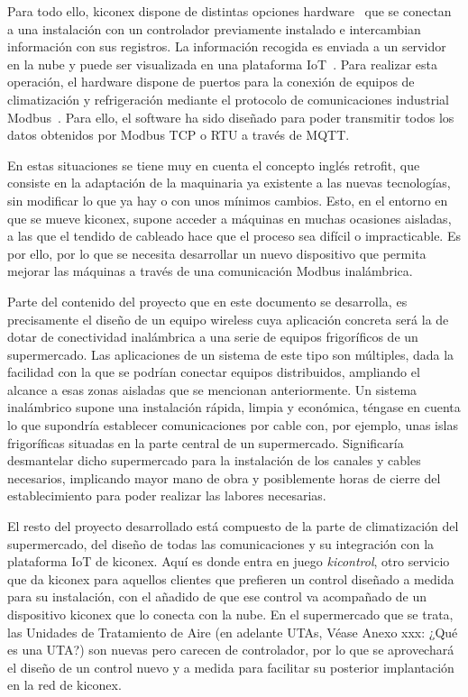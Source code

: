 Para todo ello, kiconex dispone de distintas opciones hardware~\cite{productoKiconex} que se conectan a una instalación con un controlador previamente instalado e intercambian información con sus registros. La información recogida es enviada a un servidor en la nube y puede ser visualizada en una plataforma IoT~\cite{appKiconex}. Para realizar esta operación, el hardware dispone de puertos para la conexión de equipos de climatización y refrigeración mediante el protocolo de comunicaciones industrial Modbus~\cite{modbusorg}. Para ello, el software ha sido diseñado para poder transmitir todos los datos obtenidos por Modbus TCP o RTU a través de MQTT.

En estas situaciones se tiene muy en cuenta el concepto inglés retrofit, que consiste en la adaptación de la maquinaria ya existente a las nuevas tecnologías, sin modificar lo que ya hay o con unos mínimos cambios. Esto, en el entorno en que se mueve kiconex, supone acceder a máquinas en muchas ocasiones aisladas, a las que el tendido de cableado hace que el proceso sea difícil o impracticable. Es por ello, por lo que se necesita desarrollar un nuevo dispositivo que permita mejorar las máquinas a través de una comunicación Modbus inalámbrica.

Parte del contenido del proyecto que en este documento se desarrolla, es precisamente el diseño de un equipo wireless cuya aplicación concreta será la de dotar de conectividad inalámbrica a una serie de equipos frigoríficos de un supermercado. Las aplicaciones de un sistema de este tipo son múltiples, dada la facilidad con la que se podrían conectar equipos distribuidos, ampliando el alcance a esas zonas aisladas que se mencionan anteriormente. Un sistema inalámbrico supone una instalación rápida, limpia y económica, téngase en cuenta lo que supondría establecer comunicaciones por cable con, por ejemplo, unas islas frigoríficas situadas en la parte central de un supermercado. Significaría desmantelar dicho supermercado para la instalación de los canales y cables necesarios, implicando mayor mano de obra y posiblemente horas de cierre del establecimiento para poder realizar las labores necesarias.

El resto del proyecto desarrollado está compuesto de la parte de climatización del supermercado, del diseño de todas las comunicaciones y su integración con la plataforma IoT de kiconex. Aquí es donde entra en juego \textit{kicontrol}, otro servicio que da kiconex para aquellos clientes que prefieren un control diseñado a medida para su instalación, con el añadido de que ese control va acompañado de un dispositivo kiconex que lo conecta con la nube. En el supermercado que se trata, las Unidades de Tratamiento de Aire (en adelante UTAs, Véase Anexo xxx: ¿Qué es una UTA?) son nuevas pero carecen de controlador, por lo que se aprovechará el diseño de un control nuevo y a medida para facilitar su posterior implantación en la red de kiconex.



